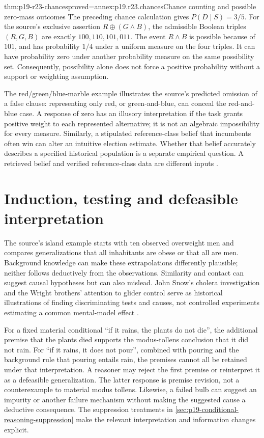 \begin{hbtheorem}{thm:p19-r23-chances}{proved=annex:p19.r23.chances}{Chance counting and possible zero-mass outcomes}
The preceding chance calculation gives \(P(D\mid S)=3/5\).
For the source's exclusive assertion
\(R\mathbin{\oplus}(G\land B)\), the admissible Boolean triples
\((R,G,B)\) are exactly \(100,110,101,011\). The event
\(R\land B\) is possible because of \(101\), and has probability
\(1/4\) under a uniform measure on the four triples. It can have
probability zero under another probability measure on the same possibility
set. Consequently, possibility alone does not force a positive probability
without a support or weighting assumption.
\end{hbtheorem}

The red/green/blue-marble example illustrates the source's predicted
omission of a false clause: representing only red, or green-and-blue,
can conceal the red-and-blue case. A response of zero has an illusory
interpretation if the task grants positive weight to each represented
alternative; it is not an algebraic impossibility for every measure.
Similarly, a stipulated reference-class belief that incumbents often
win can alter an intuitive election estimate. Whether that belief
accurately describes a specified historical population is a separate
empirical question. A retrieved belief and verified reference-class
data are different inputs \cite[pp.~150--152]{JohnsonLaird2021MentalModels}.

\section{Induction, testing and defeasible interpretation}
\label{sec:p19-r23-testing}

The source's island example starts with ten observed overweight men
and compares generalizations that all inhabitants are obese or that
all are men. Background knowledge can make these extrapolations
differently plausible; neither follows deductively from the observations.
Similarity and contact can suggest causal hypotheses but
can also mislead. John Snow's cholera investigation and the Wright
brothers' attention to glider control serve as historical illustrations
of finding discriminating tests and causes, not controlled experiments
estimating a common mental-model effect
\cite[pp.~152--154]{JohnsonLaird2021MentalModels}.

For a fixed material conditional ``if it rains, the plants do not die'',
the additional premise that the plants died supports the modus-tollens
conclusion that it did not rain. For ``if it rains, it does not pour'',
combined with pouring and the background rule that pouring entails rain,
the premises cannot all be retained under that interpretation. A reasoner
may reject the first premise or reinterpret it as a defeasible
generalization. The latter response is premise revision, not a
counterexample to material modus tollens. Likewise, a failed bulb can
suggest an impurity or another failure mechanism without making the
suggested cause a deductive consequence. The suppression treatments in
\cref{sec:p19-conditional-reasoning-suppression} make the relevant
interpretation and information changes explicit.

